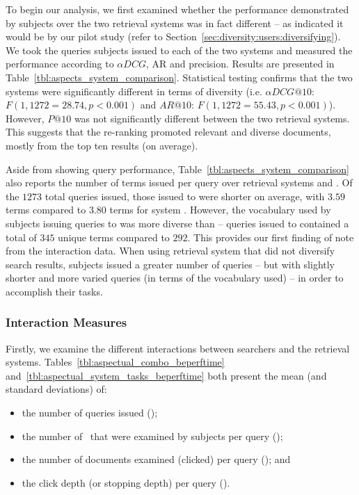 To begin our analysis, we first examined whether the performance demonstrated by subjects over the two retrieval systems was in fact different -- as indicated it would be by our pilot study (refer to Section~\ref{sec:diversity:users:diversifying}). We took the queries subjects issued to each of the two systems and measured the performance according to $\alpha DCG$, AR and precision. Results are presented in Table~\ref{tbl:aspects_system_comparison}. Statistical testing confirms that the two systems were significantly different in terms of diversity (i.e. $\alpha DCG@10$: $F(1, 1272=28.74, p<0.001)$ and $AR@10$: $F(1,1272 = 55.43, p<0.001)$). However, $P@10$ was not significantly different between the two retrieval systems. This suggests that the re-ranking promoted relevant and diverse documents, mostly from the top ten results (on average).

Aside from showing query performance, Table~\ref{tbl:aspects_system_comparison} also reports the number of terms issued per query over retrieval systems  and . Of the $1273$ total queries issued, those issued to  were shorter on average, with $3.59$ terms compared to $3.80$ terms for system . However, the vocabulary used by subjects issuing queries to  was more diverse than  -- queries issued to  contained a total of $345$ unique terms compared to $292$. This provides our first finding of note from the interaction data. When using retrieval system  that did not diversify search results, subjects issued a greater number of queries -- but with slightly shorter and more varied queries (in terms of the vocabulary used) -- in order to accomplish their tasks.

\subsubsection{Interaction Measures}
\vspace*{-2mm}
Firstly, we examine the different interactions between searchers and the retrieval systems. Tables~\ref{tbl:aspectual_combo_beperftime} and~\ref{tbl:aspectual_system_tasks_beperftime} both present the mean (and standard deviations) of:

\vspace*{-4mm}
\begin{itemize}
    \item{the number of queries issued ();}
    \item{the number of~ that were examined by subjects per query ();}
    \item{the number of documents examined (clicked) per query (); and}
    \item{the click depth (or stopping depth) per query ().}
\end{itemize}

